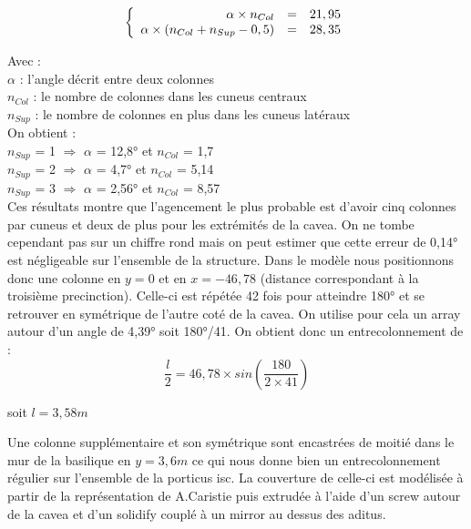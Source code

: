 \begin{equation}
  \left \{
   \begin{array}{r c l}
      \alpha \times n_{Col}  & = & 21,95 \\
      \alpha \times (n_{Col} + n_{Sup} - 0,5)   & = &  28,35
   \end{array}
   \right .
\end{equation}

Avec : \\
$\alpha$ : l'angle décrit entre deux colonnes \\
$n_{Col}$ : le nombre de colonnes dans les cuneus centraux \\
$n_{Sup}$ : le nombre de colonnes en plus dans les cuneus latéraux \\

On obtient : \\
$n_{Sup}$ = 1 $\Rightarrow$ $\alpha$ = 12,8° et $n_{Col}$ = 1,7 \\
$n_{Sup}$ = 2 $\Rightarrow$ $\alpha$ = 4,7° et $n_{Col}$ = 5,14 \\
$n_{Sup}$ = 3 $\Rightarrow$ $\alpha$ = 2,56° et $n_{Col}$ = 8,57 \\


Ces résultats montre que l'agencement le plus probable est d'avoir cinq colonnes par cuneus et deux de plus pour les extrémités de la cavea. On ne tombe cependant pas sur un chiffre rond mais on peut estimer que cette erreur  de 0,14° est négligeable sur l'ensemble de la structure. Dans le modèle nous positionnons donc une colonne en $y=0$ et en $x=-46,78$ (distance correspondant à la troisième precinction). Celle-ci est répétée 42 fois pour atteindre 180° et se retrouver en symétrique de l'autre coté de la cavea. On utilise pour cela un \gls{array} autour d'un angle de 4,39° soit 180°/41. On obtient donc un entrecolonnement de :
\begin{equation}
	\frac{l}{2} =  46,78 \times  sin(\frac{180}{2 \times 41}) 
\end{equation}
\begin{center}
	soit $l = 3,58m$
\end{center}	

Une colonne supplémentaire et son symétrique sont encastrées de moitié dans le mur de la basilique en $y=3,6m$ ce qui nous donne bien un entrecolonnement régulier sur l'ensemble de la \gls{porticus isc}. La couverture de celle-ci est modélisée à partir de la représentation de A.Caristie \cite[Pl. III et VI]{orangePl} puis extrudée à l'aide d'un \gls{screw} autour de la cavea et d'un \gls{solidify} couplé à un \gls{mirror} au dessus des aditus.

